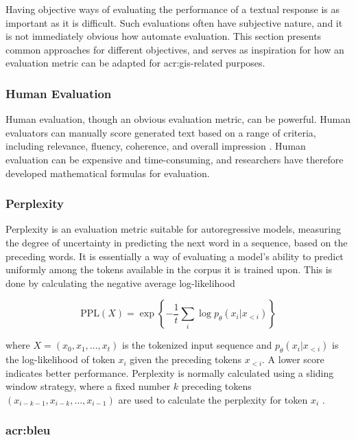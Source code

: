 Having objective ways of evaluating the performance of a textual response is as important as it is difficult. Such evaluations often have subjective nature, and it is not immediately obvious how automate evaluation. This section presents common approaches for different objectives, and serves as inspiration for how an evaluation metric can be adapted for \acrshort{acr:gis}-related purposes.

\subsubsection{Human Evaluation}

Human evaluation, though an obvious evaluation metric, can be powerful. Human evaluators can manually score generated text based on a range of criteria, including relevance, fluency, coherence, and overall impression \citep{ceylanLargeLanguageModel2023}. Human evaluation can be expensive and time-consuming, and researchers have therefore developed mathematical formulas for evaluation.

\subsubsection{Perplexity}

Perplexity is an evaluation metric suitable for autoregressive models, measuring the degree of uncertainty in predicting the next word in a sequence, based on the preceding words. It is essentially a way of evaluating a model's ability to predict uniformly among the tokens available in the corpus it is trained upon. This is done by calculating the negative average log-likelihood

\begin{equation}
    \text{PPL}(X) = \exp \left\{ -\frac{1}{t} \sum_{i} \log p_\theta(x_i | x_{<i}) \right\}
    \label{eq:ppl}
\end{equation}

\noindent where $X = (x_0, x_1, \ldots, x_t)$ is the tokenized input sequence and $p_\theta(x_i | x_{<i})$ is the log-likelihood of token $x_i$ given the preceding tokens $x_{<i}$. A lower score indicates better performance. Perplexity is normally calculated using a sliding window strategy, where a fixed number $k$ preceding tokens $(x_{i-k-1},x_{i-k},\ldots,x_{i-1})$ are used to calculate the perplexity for token $x_i$ \citep{huggingfacePerplexityFixedlengthModels}.

\subsubsection[BiLingual Evaluation Understudy]{\acrfull{acr:bleu}}

